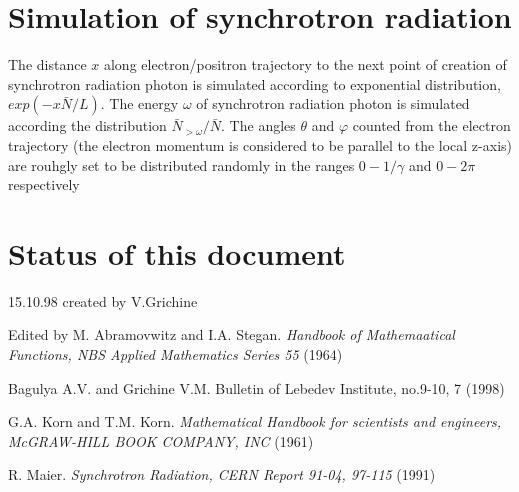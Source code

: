 \section{Simulation of synchrotron radiation}

The distance $x$ along electron/positron trajectory to the next point of 
creation of synchrotron radiation 
photon is simulated according to exponential distribution,
$exp(-x\bar{N}/L)$. The energy $\omega$ of synchrotron radiation photon 
is simulated
according the distribution $\bar{N}_{>\omega}/\bar{N}$. The angles $\theta$ 
and $\varphi$ counted from the electron trajectory (the electron momentum 
is considered to be parallel to the local z-axis) are rouhgly set to be 
distributed randomly in the ranges
$0 - 1/\gamma$ and $0 - 2\pi$ respectively

\section{Status of this document}
15.10.98 created by V.Grichine

\begin{thebibliography}{99}

 Edited by M. Abramovwitz and I.A. Stegan.
{\em Handbook of Mathemaatical Functions,
 NBS Applied Mathematics Series 55} (1964)

 Bagulya A.V. and Grichine V.M.
{Bulletin of Lebedev Institute, no.9-10, 7 } (1998)

G.A. Korn and T.M. Korn. 
{\em Mathematical Handbook for scientists and 
    engineers, McGRAW-HILL BOOK COMPANY, INC} (1961)

  R. Maier.
{\em Synchrotron Radiation, CERN Report 91-04, 97-115} (1991)

\end{thebibliography}




